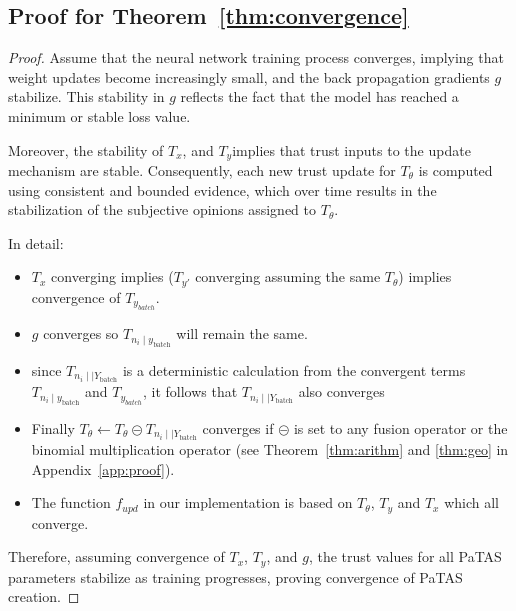 \subsection{Proof for Theorem~\ref{thm:convergence}}
\begin{proof}
Assume that the neural network training process converges, implying that weight updates become increasingly small, and the back propagation gradients \( g \) stabilize. This stability in \( g \) reflects the fact that the model has reached a minimum or stable loss value.

Moreover, the stability of \( T_x \), and \( T_y \)implies that trust inputs to the update mechanism are stable. Consequently, each new trust update for \( T_{\theta} \) is computed using consistent and bounded evidence, which over time results in the stabilization of the subjective opinions assigned to \( T_{\theta} \).

In detail:
\begin{itemize}
    \item \(T_x\) converging implies (\(T_{y\prime}\) converging assuming the same \(T_\theta\)) implies convergence of \(T_{y_{batch}}\).

    \item \(g\) converges so \(T_{n_i \mid y_\text{batch}}\) will remain the same. 
    
    \item since \(T_{n_i\mid \mid {Y_\text{batch}}}\) is a deterministic calculation from the convergent terms  \(T_{n_i \mid y_\text{batch}}\) and \(T_{y_{batch}}\), it follows that \(T_{n_i\mid \mid {Y_\text{batch}}}\) also converges 

    \item Finally \(T_{\theta} \longleftarrow T_{\theta} \circleddash T_{n_i\mid \mid {Y_\text{batch}}}\) converges if \(\circleddash\) is set to any fusion operator or the binomial multiplication operator (see Theorem~\ref{thm:arithm} and \ref{thm:geo} in Appendix~\ref{app:proof}). 

    \item The function \(f_{upd}\) in our implementation is based on \(T_{\theta}\), \(T_{y}\) and \({T_{x}}\) which all converge.
\end{itemize}

Therefore, assuming convergence of $T_x$, $T_y$, and $g$, the trust values for all PaTAS parameters stabilize as training progresses, proving convergence of PaTAS creation. 
\end{proof}





